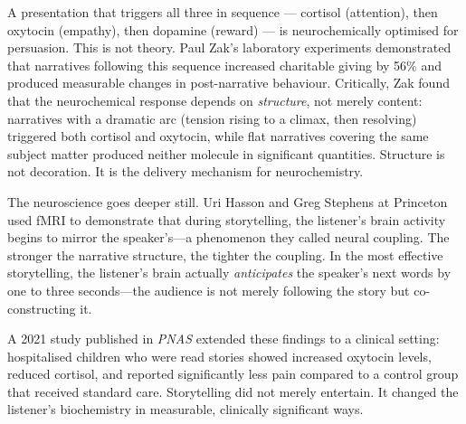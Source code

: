 A presentation that triggers all three in sequence --- cortisol (attention), then oxytocin (empathy), then dopamine (reward) --- is neurochemically optimised for persuasion. This is not theory. Paul Zak's laboratory experiments demonstrated that narratives following this sequence increased charitable giving by 56\% and produced measurable changes in post-narrative behaviour. Critically, Zak found that the neurochemical response depends on \emph{structure}, not merely content: narratives with a dramatic arc (tension rising to a climax, then resolving) triggered both cortisol and oxytocin, while flat narratives covering the same subject matter produced neither molecule in significant quantities. Structure is not decoration. It is the delivery mechanism for neurochemistry.

The neuroscience goes deeper still. Uri Hasson and Greg Stephens at Princeton used fMRI to demonstrate that during storytelling, the listener's brain activity begins to mirror the speaker's---a phenomenon they called neural coupling. The stronger the narrative structure, the tighter the coupling. In the most effective storytelling, the listener's brain actually \emph{anticipates} the speaker's next words by one to three seconds---the audience is not merely following the story but co-constructing it.

A 2021 study published in \emph{PNAS} extended these findings to a clinical setting: hospitalised children who were read stories showed increased oxytocin levels, reduced cortisol, and reported significantly less pain compared to a control group that received standard care. Storytelling did not merely entertain. It changed the listener's biochemistry in measurable, clinically significant ways.

